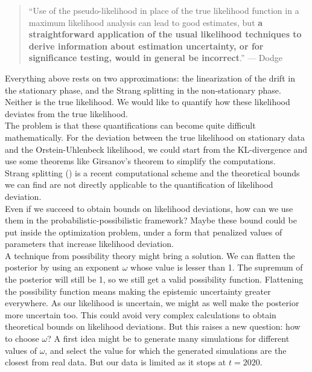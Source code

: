 \documentclass[12pt,a4paper]{article}
\theoremstyle{definition}
\theoremstyle{plain}
\begin{document}
\begin{quote}
\small
``Use of the pseudo-likelihood in place of the true likelihood function in a maximum likelihood
analysis can lead to good estimates, but \textbf{a straightforward application of the usual
likelihood techniques to derive information about estimation uncertainty, or for significance
testing, would in general be incorrect}.'' \hfill--- Dodge \cite{dodge2003}
\end{quote}

\noindent Everything above rests on two approximations: the linearization of the drift in the stationary
phase, and the Strang splitting in the non-stationary phase. Neither is the true likelihood.
We would like to quantify how these likelihood deviates from the true likelihood. \\

\noindent The problem is that these quantifications can become quite difficult mathematically. For the deviation between the true likelihood on stationary data and the Orstein-Uhlenbeck likelihood, we could start from the KL-divergence and use some theorems like Girsanov's theorem to simplify the computations. \\

\noindent Strang splitting (\cite{pilipovic2024}) is a recent computational scheme and the theoretical bounds we can find are not directly applicable to the quantification of likelihood deviation. \\

\noindent Even if we succeed to obtain bounds on likelihood deviations, how can we use them in the probabilistic-possibilistic framework? Maybe these bound could be put inside the optimization problem, under a form that penalized values of parameters that increase likelihood deviation. \\

\noindent A technique from possibility theory might bring a solution. We can flatten the posterior by using an exponent $\omega$ whose value is lesser than 1. The supremum of the posterior will still be 1, so we still get a valid possibility function. Flattening the possibility function means making the epistemic uncertainty greater everywhere. As our likelihood is uncertain, we might as well make the posterior more uncertain too. This could avoid very complex calculations to obtain theoretical bounds on likelihood deviations. But this raises a new question: how to choose $\omega$? A first idea might be to generate many simulations for different values of $\omega$, and select the value for which the generated simulations are the closest from real data. But our data is limited as it stops at $t=2020$. \\
\end{document}
